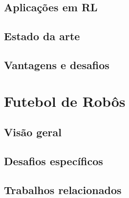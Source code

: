 \subsection{Aplicações em RL}
\label{subsec:curriculum_rl}

\subsection{Estado da arte}
\label{subsec:curriculum_estado_arte}

\subsection{Vantagens e desafios}
\label{subsec:curriculum_vantagens_desafios}

\section{Futebol de Robôs}
\label{sec:futebol_robos}

\subsection{Visão geral}
\label{subsec:futebol_visao}

\subsection{Desafios específicos}
\label{subsec:futebol_desafios}

\subsection{Trabalhos relacionados}
\label{subsec:futebol_trabalhos}
